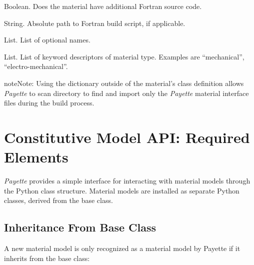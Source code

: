 \documentclass[letterpaper,10pt,english]{sphinxmanual}
\begin{document}
\begin{fulllineitems}
Boolean.  Does the material have additional Fortran source code.

\end{fulllineitems}



\begin{fulllineitems}
String.  Absolute path to Fortran build script, if applicable.

\end{fulllineitems}



\begin{fulllineitems}
List.  List of optional names.

\end{fulllineitems}



\begin{fulllineitems}
List. List of keyword descriptors of material type. Examples are ``mechanical'',
``electro-mechanical''.

\end{fulllineitems}


\begin{notice}{note}{Note:}
Using the  dictionary outside of the material's class definition
allows \emph{Payette} to scan  directory to
find and import only the \emph{Payette} material interface files during the build
process.
\end{notice}


\section{Constitutive Model API: Required Elements}
\label{Files/installing_materials:constitutive-model-api-required-elements}
\emph{Payette} provides a simple interface for interacting with material models
through the Python class structure. Material models are installed as separate
Python classes, derived from the  base class.


\subsection{Inheritance From Base Class}
\label{Files/installing_materials:inheritance-from-base-class}
A new material model  is only recognized as a material model by
Payette if it inherits from the  base class:
\end{document}
